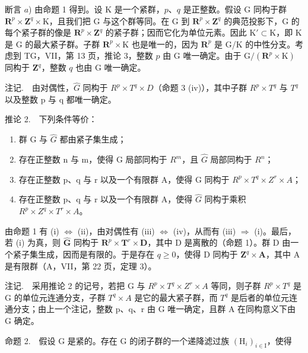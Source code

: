 断言 \(a\)) 由命题 1 得到。设 K 是一个紧群，\(p\)、\(q\) 是正整数。假设 G 同构于群 \(\mathbf{R}^{p} \times \mathbf{Z}^{q} \times \mathrm{K}\)，且我们把 G 与这个群等同。在 G 到 \(\mathbf{R}^{p} \times \mathbf{Z}^{q}\) 的典范投影下，G 的每个紧子群的像是 \(\mathbf{R}^{p} \times \mathbf{Z}^{q}\) 的紧子群；因而它化为单位元素。因此 \(\mathrm{K}' \subset \mathrm{K}\)，即 K 是 G 的最大紧子群。子群 \(\mathbf{R}^{p} \times \mathrm{K}\) 也是唯一的，因为 \(\mathbf{R}^{p}\) 是 G/K 的中性分支。考虑到 TG，VII，第 13 页，推论 3，整数 \(p\) 由 G 唯一确定。由于 \(\mathrm{G}/(\mathbf{R}^{p} \times \mathrm{K})\) 同构于 \(\mathbf{Z}^{q}\)，整数 \(q\) 也由 G 唯一确定。

注记.　由对偶性，\(\hat{G}\) 同构于 \(R^{p} \times T^{q} \times D\)（命题 3 (iv)），其中子群 \(R^{p} \times T^{q}\) 与 \(T^{q}\) 以及整数 p 与 q 都唯一确定。

推论 2.　下列条件等价：

\begin{enumerate}
\def\labelenumi{(\roman{enumi})}
\item
  群 G 与 \(\hat{G}\) 都由紧子集生成；
\item
  存在正整数 n 与 m，使得 G 局部同构于 \(R^{m}\)，且 \(\hat{G}\) 局部同构于 \(R^{n}\)；
\item
  存在正整数 p、q 与 r 以及一个有限群 A，使得 G 同构于 \(R^{p} \times T^{q} \times Z^{r} \times A\)；
\item
  存在正整数 p、q 与 r 以及一个有限群 A，使得 \(\hat{G}\) 同构于乘积 \(R^{p} \times Z^{q} \times T^{r} \times A\)。
\end{enumerate}

由命题 1 有 (i) \(\Leftrightarrow\) (ii)，由对偶性有 (iii) \(\Leftrightarrow\) (iv)，从而有 (iii) \(\Rightarrow\) (i)。最后，若 (i) 为真，则 \(\widehat{\mathbf{G}}\) 同构于 \(\mathbf{R}^{p} \times \mathbf{T}^{r} \times \mathbf{D}\)，其中 D 是离散的（命题 1）。群 D 由一个紧子集生成，因而是有限的。于是存在 \(q \geqslant 0\)，使得 D 同构于 \(\mathbf{Z}^{q} \times \mathbf{A}\)，其中 A 是有限群（A，VII，第 22 页，定理 3）。

注记.　采用推论 2 的记号，若把 G 与 \(R^{p} \times T^{q} \times Z^{r} \times A\) 等同，则子群 \(R^{p} \times T^{q}\) 是 G 的单位元连通分支，子群 \(T^{q} \times A\) 是它的最大紧子群，而 \(T^{q}\) 是后者的单位元连通分支；由上一个注记，整数 p、q、r 由 G 唯一确定，且群 A 在同构意义下由 G 确定。

命题 2.　假设 G 是紧的。存在 G 的闭子群的一个递降滤过族 \((\mathrm{H}_{i})_{i\in\mathrm{I}}\)，使得

